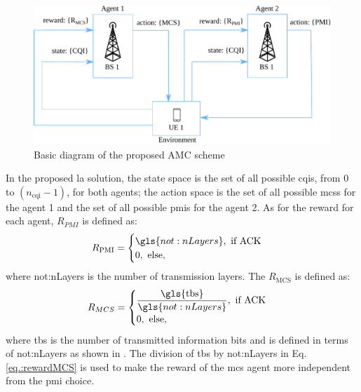 %
\begin{figure}[!hb]
	\centerline{\includegraphics[width=\columnwidth]{figures/chp_la/rl-framework-mateus.pdf}}
	\caption{Basic diagram of the proposed AMC scheme}
	\label{fig:la-rl-frame}
\end{figure}
%

In the proposed \gls{la} solution, the state space is the set of all possible \gls{cqi}s, from $0$ to $(n_{\text{cqi}}-1)$, for both agents; the action space is the set of all possible \gls{mcs}s for the agent 1 and the set of all possible \gls{pmi}s for the agent 2. As for the reward for each agent, $R_{PMI}$ is defined as:
%
\begin{equation}\label{eq.:rewardPMI}
R_{\text{PMI}} = \begin{cases}
\gls{not:nLayers}, \text{ if ACK} \\
0, \text{ else,}
\end{cases}
\end{equation}
%
\noindent where \gls{not:nLayers} is the number of transmission layers. The $R_{\text{MCS}}$ is defined as:
\begin{equation}\label{eq.:rewardMCS}
R_{MCS} = \begin{cases}
\dfrac{\textrm{\gls{tbs}}}{\gls{not:nLayers}}, \text{ if ACK} \\
0, \text{ else,}
\end{cases}
\end{equation}
\noindent where \gls{tbs} is the number of transmitted information bits and is defined in terms of \gls{not:nLayers} as shown in \cite{3gpp.38.214}.
%
The division of \gls{tbs} by \gls{not:nLayers} in Eq. \eqref{eq.:rewardMCS} is used to make the reward of the \gls{mcs} agent more independent from the \gls{pmi} choice.
%

